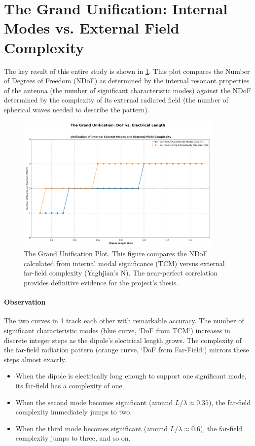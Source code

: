 \documentclass[11pt, a4paper]{report}
\begin{document}
\section{The Grand Unification: Internal Modes vs. External Field Complexity}
The key result of this entire study is shown in \cref{fig:dof_unification}. This plot compares the Number of Degrees of Freedom (NDoF) as determined by the internal resonant properties of the antenna (the number of significant characteristic modes) against the NDoF determined by the complexity of its external radiated field (the number of spherical waves needed to describe the pattern).

\begin{figure}[H]
    \centering
    \includegraphics[width=0.9\textwidth]{Fig_Project_Unification.png}
    \caption{The Grand Unification Plot. This figure compares the NDoF calculated from internal modal significance (TCM) versus external far-field complexity (Yaghjian's N). The near-perfect correlation provides definitive evidence for the project's thesis.}
    \label{fig:dof_unification}
\end{figure}

\paragraph{Observation}
The two curves in \cref{fig:dof_unification} track each other with remarkable accuracy. The number of significant characteristic modes (blue curve, `DoF from TCM`) increases in discrete integer steps as the dipole's electrical length grows. The complexity of the far-field radiation pattern (orange curve, `DoF from Far-Field`) mirrors these steps almost exactly.
\begin{itemize}
    \item When the dipole is electrically long enough to support one significant mode, its far-field has a complexity of one.
    \item When the second mode becomes significant (around $L/\lambda \approx 0.35$), the far-field complexity immediately jumps to two.
    \item When the third mode becomes significant (around $L/\lambda \approx 0.6$), the far-field complexity jumps to three, and so on.
\end{itemize}
\end{document}
